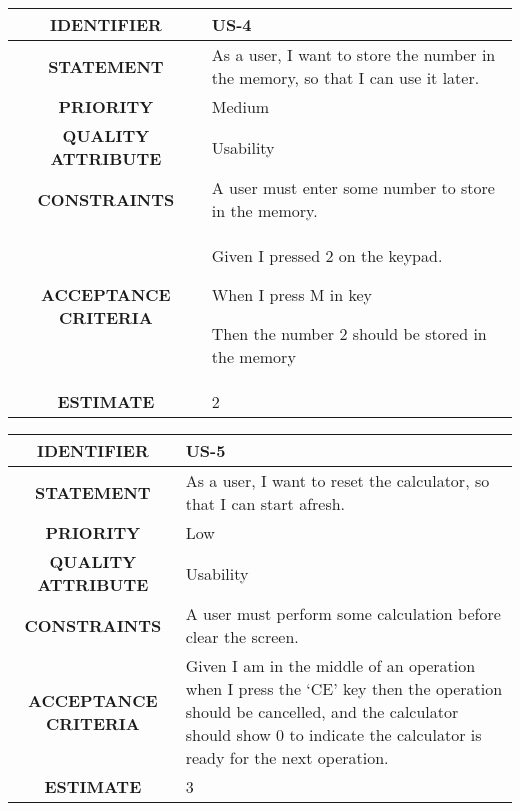 \documentclass[12pt, a4paper]{article}
\begin{document}
\newpage
\vspace*{0.8 cm}

\begin{tabular}{|c|p{10cm}|}
    \hline
    \textbf{IDENTIFIER}    & US-4 \\
    \hline
    \textbf{STATEMENT} & As a user, I want to store the number in the memory, so that I can use it later.\\
    \hline
    \textbf{PRIORITY}     & Medium \\
    \hline
    \textbf{QUALITY ATTRIBUTE}     & Usability \\
    \hline
    \textbf{CONSTRAINTS}     & A user must enter some number to store in the memory.\\
    \hline
    \textbf{ACCEPTANCE CRITERIA}    & Given I pressed 2 on the keypad.

    When I press M in key
    
    Then the number 2 should be stored in the memory\\
    \hline
    \textbf{ESTIMATE}     & 2 \\
    \hline 
\end{tabular}

\vspace*{2 cm}

\begin{tabular}{|c|p{10cm}|}
    \hline
    \textbf{IDENTIFIER}     & US-5 \\
    \hline
    \textbf{STATEMENT} & As a user, I want to reset the calculator, so that I can start afresh.\\
    \hline
    \textbf{PRIORITY}     & Low \\
    \hline
    \textbf{QUALITY ATTRIBUTE}     & Usability \\
    \hline
    \textbf{CONSTRAINTS}    & A user must perform some calculation before clear the screen.\\
    \hline
    \textbf{ACCEPTANCE CRITERIA} &   Given I am in the middle of an operation when I press the ‘CE’ key then the operation should be cancelled, and the calculator should show 0 to indicate the calculator is ready for the next operation.\\
    \hline
    \textbf{ESTIMATE}     & 3 \\
    \hline 
\end{tabular}

\vspace*{2 cm}
\end{document}
